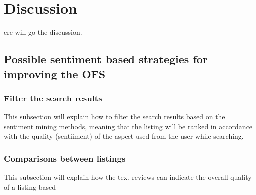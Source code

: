 %
%
\let\textcircled=\pgftextcircled
\chapter{Discussion}
\label{chap:dis}

ere will go the discussion.
\section{Possible sentiment based strategies for improving the OFS}
\subsection{Filter the search results}
This subsection will explain how to filter the search results based on the sentiment mining methods, meaning that the listing will be ranked in accordance with the quality (sentiiment) of the aspect used from the user while searching. 
\subsection{Comparisons between listings}
This subsection will explain how the text reviews can indicate the overall quality of a listing based 